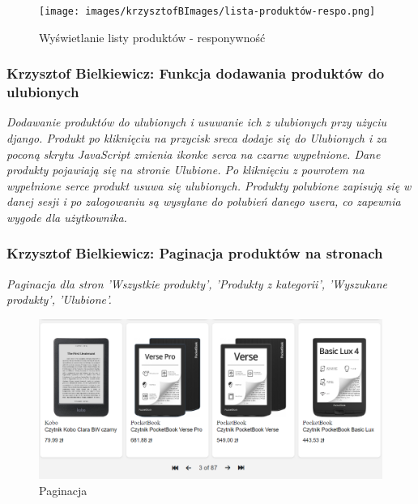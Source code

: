\documentclass[12pt,a4paper,oneside]{article}
\theoremstyle{definition}
\numberwithin{equation}{section}
\begin{document}
\begin{figure}[H]
    \centering
    \texttt{[image: images/krzysztofBImages/lista-produktów-respo.png]}
    \caption{Wyświetlanie listy produktów - responywność}
    \label{products-respo}
\end{figure}



\subsubsection{Krzysztof Bielkiewicz: Funkcja dodawania produktów do ulubionych}
\label{1.3.14}
\textit{Dodawanie produktów do ulubionych i usuwanie ich z ulubionych przy użyciu django.
Produkt po kliknięciu na przycisk sreca dodaje się do Ulubionych i za poconą skrytu 
JavaScript zmienia ikonke serca na czarne wypełnione. Dane produkty pojawiają się na stronie Ulubione.
Po kliknięciu z powrotem na wypełnione serce produkt usuwa się ulubionych.
Produkty polubione zapisują się w danej sesji i po zalogowaniu są wysyłane do polubień danego usera,
co zapewnia wygode dla użytkownika.}


\subsubsection{Krzysztof Bielkiewicz: Paginacja produktów na stronach}
\label{1.3.15}
\textit{Paginacja dla stron 'Wszystkie produkty', 'Produkty z kategorii', 'Wyszukane produkty', 'Ulubione'.}
\begin{figure}[H]
    \centering
    \includegraphics[width=1.0\columnwidth]{images/krzysztofBImages/pagination.png}
    \caption{Paginacja}
    \label{pagination}
\end{figure}
\end{document}

